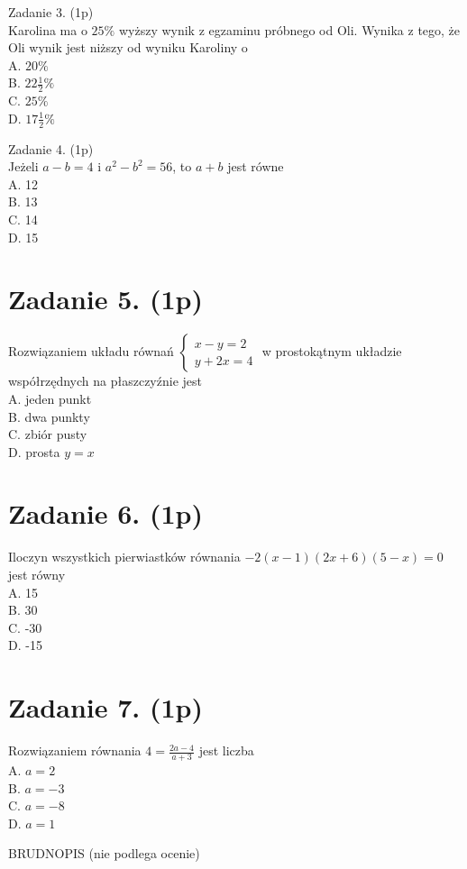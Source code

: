 \documentclass[10pt]{article}
\begin{document}
Zadanie 3. (1p)\\
Karolina ma o \(25 \%\) wyższy wynik z egzaminu próbnego od Oli. Wynika z tego, że Oli wynik jest niższy od wyniku Karoliny o\\
A. \(20 \%\)\\
B. \(22 \frac{1}{2} \%\)\\
C. \(25 \%\)\\
D. \(17 \frac{1}{2} \%\)

Zadanie 4. (1p)\\
Jeżeli \(a-b=4\) i \(a^{2}-b^{2}=56\), to \(a+b\) jest równe\\
A. 12\\
B. 13\\
C. 14\\
D. 15

\section*{Zadanie 5. (1p)}
Rozwiązaniem układu równań \(\left\{\begin{array}{l}x-y=2 \\ y+2 x=4\end{array}\right.\) w prostokątnym układzie współrzędnych na płaszczyźnie jest\\
A. jeden punkt\\
B. dwa punkty\\
C. zbiór pusty\\
D. prosta \(y=x\)

\section*{Zadanie 6. (1p)}
Iloczyn wszystkich pierwiastków równania \(-2(x-1)(2 x+6)(5-x)=0\) jest równy\\
A. 15\\
B. 30\\
C. -30\\
D. -15

\section*{Zadanie 7. (1p)}
Rozwiązaniem równania \(4=\frac{2 a-4}{a+3}\) jest liczba\\
A. \(a=2\)\\
B. \(a=-3\)\\
C. \(a=-8\)\\
D. \(a=1\)

BRUDNOPIS (nie podlega ocenie)
\end{document}
